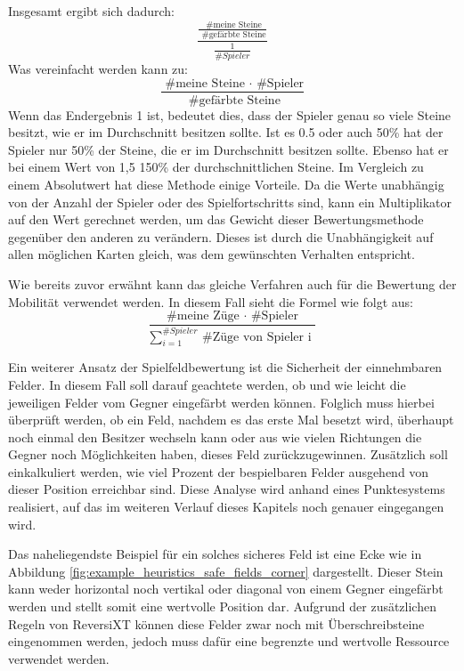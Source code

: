 \documentclass[12pt,a4paper,bibliography=totocnumbered,listof=totocnumbered]{article}
\begin{document}
Insgesamt ergibt sich dadurch:
\[ \frac{ \frac{\text{ \# meine Steine}}{\text{ \# gefärbte Steine}} }{ \frac{1}{ \# Spieler} } \]
Was vereinfacht werden kann zu:
\[ \frac{ \text{ \# meine Steine } \cdot \text{ \# Spieler} }{ \text{ \# gefärbte Steine} } \] 
Wenn das Endergebnis 1 ist, bedeutet dies, dass der Spieler genau so viele Steine besitzt, wie er im Durchschnitt besitzen sollte. Ist es 0.5 oder auch 50\% hat der Spieler nur 50\% der Steine, die er im Durchschnitt besitzen sollte. Ebenso hat er bei einem Wert von 1,5 150\% der durchschnittlichen Steine.
Im Vergleich zu einem Absolutwert hat diese Methode einige Vorteile. Da die Werte unabhängig von der Anzahl der Spieler oder des Spielfortschritts sind, kann ein Multiplikator auf den Wert gerechnet werden, um das Gewicht dieser Bewertungsmethode gegenüber den anderen zu verändern. Dieses ist durch die Unabhängigkeit auf allen möglichen Karten gleich, was dem gewünschten Verhalten entspricht.

Wie bereits zuvor erwähnt kann das gleiche Verfahren auch für die Bewertung der Mobilität verwendet werden. In diesem Fall sieht die Formel wie folgt aus:
\[ \frac{ \text{ \# meine Züge } \cdot \text{ \# Spieler } }{ \sum_{i=1}^{ \#Spieler} \text{ \# Züge von Spieler i } }  \]


Ein weiterer Ansatz der Spielfeldbewertung ist die \glqq Sicherheit\grqq{} der einnehmbaren Felder. In diesem Fall soll darauf geachtete werden, ob und wie leicht die jeweiligen Felder vom Gegner eingefärbt werden können. Folglich muss hierbei überprüft werden, ob ein Feld, nachdem es das erste Mal besetzt wird, überhaupt noch einmal den Besitzer wechseln kann oder aus wie vielen Richtungen die Gegner noch Möglichkeiten haben, dieses Feld zurückzugewinnen. Zusätzlich soll einkalkuliert werden, wie viel Prozent der bespielbaren Felder ausgehend von dieser Position erreichbar sind. Diese Analyse wird anhand eines Punktesystems realisiert, auf das im weiteren Verlauf dieses Kapitels noch genauer eingegangen wird.

Das naheliegendste Beispiel für ein solches sicheres Feld ist eine Ecke wie in Abbildung \ref{fig:example_heuristics_safe_fields_corner} dargestellt. Dieser Stein kann weder horizontal noch vertikal oder diagonal von einem Gegner eingefärbt werden und stellt somit eine wertvolle Position dar. Aufgrund der zusätzlichen Regeln von ReversiXT können diese Felder zwar noch mit Überschreibsteine eingenommen werden, jedoch muss dafür eine begrenzte und wertvolle Ressource verwendet werden.
\end{document}
